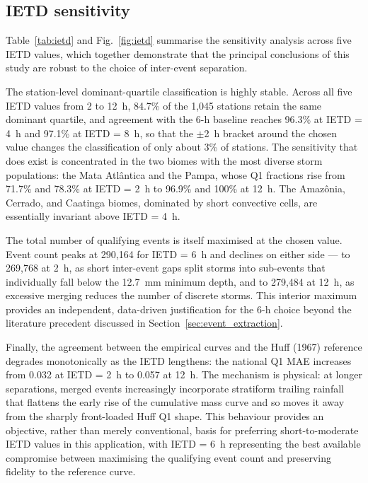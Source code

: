 \documentclass[a4paper,fleqn]{cas-sc}
\begin{document}
\subsection{IETD sensitivity}
\label{sec:ietd}

Table~\ref{tab:ietd} and Fig.~\ref{fig:ietd} summarise the
sensitivity analysis across five IETD values, which together
demonstrate that the principal conclusions of this study are robust
to the choice of inter-event separation.

The station-level dominant-quartile classification is highly stable.
Across all five IETD values from 2 to 12~h, 84.7\% of the 1,045
stations retain the same dominant quartile, and agreement with the
6-h baseline reaches 96.3\% at IETD = 4~h and 97.1\% at IETD = 8~h,
so that the $\pm$2~h bracket around the chosen value changes the
classification of only about 3\% of stations. The sensitivity that
does exist is concentrated in the two biomes with the most diverse
storm populations: the Mata Atlântica and the Pampa, whose Q1
fractions rise from 71.7\% and 78.3\% at IETD = 2~h to 96.9\% and
100\% at 12~h. The Amazônia, Cerrado, and Caatinga biomes, dominated
by short convective cells, are essentially invariant above IETD = 4~h.

The total number of qualifying events is itself maximised at the
chosen value. Event count peaks at 290,164 for IETD = 6~h and declines
on either side — to 269,768 at 2~h, as short inter-event gaps split
storms into sub-events that individually fall below the 12.7~mm
minimum depth, and to 279,484 at 12~h, as excessive merging reduces
the number of discrete storms. This interior maximum provides an
independent, data-driven justification for the 6-h choice beyond the
literature precedent discussed in Section~\ref{sec:event_extraction}.

Finally, the agreement between the empirical curves and the Huff
(1967) reference degrades monotonically as the IETD lengthens: the
national Q1 MAE increases from 0.032 at IETD = 2~h to 0.057 at 12~h.
The mechanism is physical: at longer separations, merged events
increasingly incorporate stratiform trailing rainfall that flattens
the early rise of the cumulative mass curve and so moves it away from
the sharply front-loaded Huff Q1 shape. This behaviour provides an
objective, rather than merely conventional, basis for preferring
short-to-moderate IETD values in this application, with IETD = 6~h
representing the best available compromise between maximising the
qualifying event count and preserving fidelity to the reference curve.
\end{document}
